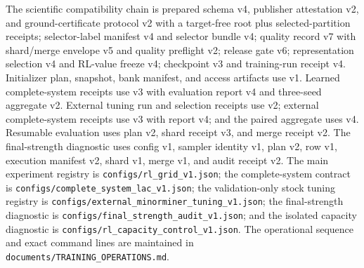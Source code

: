 \documentclass[11pt,a4paper]{article}
\newcommand{\code}[1]{\texttt{\small #1}}
\theoremstyle{definition}\newtheorem{definition}[proposition]{Definition}
\begin{document}
The scientific compatibility chain is prepared schema v4, publisher attestation v2, and ground-certificate protocol v2 with a target-free root plus selected-partition receipts; selector-label manifest v4 and selector bundle v4; quality record v7 with shard/merge envelope v5 and quality preflight v2; release gate v6; representation selection v4 and RL-value freeze v4; checkpoint v3 and training-run receipt v4. Initializer plan, snapshot, bank manifest, and access artifacts use v1. Learned complete-system receipts use v3 with evaluation report v4 and three-seed aggregate v2. External tuning run and selection receipts use v2; external complete-system receipts use v3 with report v4; and the paired aggregate uses v4. Resumable evaluation uses plan v2, shard receipt v3, and merge receipt v2. The final-strength diagnostic uses config v1, sampler identity v1, plan v2, row v1, execution manifest v2, shard v1, merge v1, and audit receipt v2. The main experiment registry is \code{configs/rl\_grid\_v1.json}; the complete-system contract is \code{configs/complete\_system\_lac\_v1.json}; the validation-only stock tuning registry is \code{configs/external\_minorminer\_tuning\_v1.json}; the final-strength diagnostic is \code{configs/final\_strength\_audit\_v1.json}; and the isolated capacity diagnostic is \code{configs/rl\_capacity\_control\_v1.json}. The operational sequence and exact command lines are maintained in \code{documents/TRAINING\_OPERATIONS.md}.
\end{document}
